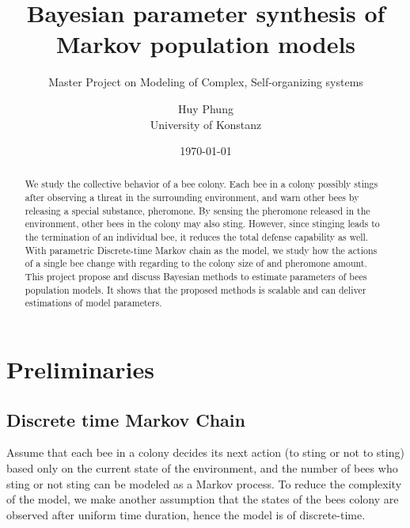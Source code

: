 \documentclass[12pt]{article}
\title{Bayesian parameter synthesis of Markov population models}
\subtitle{Master Project on Modeling of Complex, Self-organizing systems}
\author{Huy Phung\\University of Konstanz}
\date{\today}
\theoremstyle{definition}
\begin{document}
\maketitle
\pagebreak
\tableofcontents
\pagebreak

\begin{abstract}
  We study the collective behavior of a bee colony. Each bee in a colony
  possibly stings after observing a threat in the surrounding environment, and
  warn other bees by releasing a special substance, pheromone. By sensing the
  pheromone released in the environment, other bees in the colony may also
  sting. However, since stinging leads to the termination of an individual bee,
  it reduces the total defense capability as well. With parametric Discrete-time
  Markov chain as the model, we study how the actions of a single bee change
  with regarding to the colony size of and pheromone amount. This project
  propose and discuss Bayesian methods to estimate parameters of bees population
  models. It shows that the proposed methods is scalable and can deliver
  estimations of model parameters.
\end{abstract}


\section{Preliminaries}
\subsection{Discrete time Markov Chain}
Assume that each bee in a colony decides its next action (to sting or not to
sting) based only on the current state of the environment, and the number of
bees who sting or not sting can be modeled as a Markov process. To reduce the
complexity of the model, we make another assumption that the states of the bees
colony are observed after uniform time duration, hence the model is of
discrete-time. 
\end{document}

